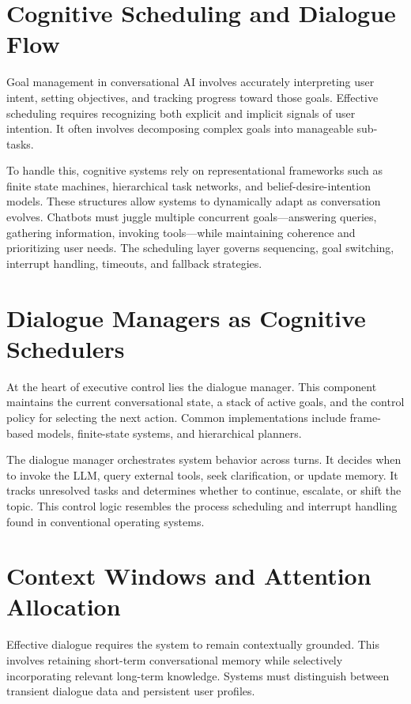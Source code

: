 \documentclass{book}
\begin{document}
\section{Cognitive Scheduling and Dialogue Flow}

Goal management in conversational AI involves accurately interpreting user intent, setting objectives, and tracking progress toward those goals. Effective scheduling requires recognizing both explicit and implicit signals of user intention. It often involves decomposing complex goals into manageable sub-tasks.

To handle this, cognitive systems rely on representational frameworks such as finite state machines, hierarchical task networks, and belief-desire-intention models. These structures allow systems to dynamically adapt as conversation evolves. Chatbots must juggle multiple concurrent goals—answering queries, gathering information, invoking tools—while maintaining coherence and prioritizing user needs. The scheduling layer governs sequencing, goal switching, interrupt handling, timeouts, and fallback strategies.

\section{Dialogue Managers as Cognitive Schedulers}

At the heart of executive control lies the dialogue manager. This component maintains the current conversational state, a stack of active goals, and the control policy for selecting the next action. Common implementations include frame-based models, finite-state systems, and hierarchical planners.

The dialogue manager orchestrates system behavior across turns. It decides when to invoke the LLM, query external tools, seek clarification, or update memory. It tracks unresolved tasks and determines whether to continue, escalate, or shift the topic. This control logic resembles the process scheduling and interrupt handling found in conventional operating systems.

\section{Context Windows and Attention Allocation}

Effective dialogue requires the system to remain contextually grounded. This involves retaining short-term conversational memory while selectively incorporating relevant long-term knowledge. Systems must distinguish between transient dialogue data and persistent user profiles.
\end{document}
